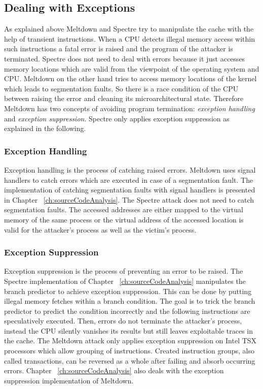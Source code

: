 \documentclass[a4paper,oneside,openright] {scrreprt}
\begin{document}
\subsection{Dealing with Exceptions}
\label{ch:intro:motivation:A}

As explained above Meltdown and Spectre try to manipulate the cache with the help of transient instructions. 
When a CPU detects illegal memory access within such instructions a fatal error is raised and the program of the attacker
is terminated. Spectre does not need to deal with errors because it just accesses memory locations which are valid from
the viewpoint of the operating system and CPU.
Meltdown on the other hand tries to access memory locations of the kernel which leads to segmentation faults.
So there is a race condition of the CPU between raising the error and cleaning its microarchitectural state.
Therefore Meltdown has two concepts of avoiding program termination: \textit{exception handling} and \textit{exception suppression}.
Spectre only applies exception suppression as explained in the following.

\subsubsection{Exception Handling}

Exception handling is the process of catching raised errors. Meltdown uses signal handlers to catch errors
which are executed in case of a segmentation fault. The implementation of catching 
segmentation faults with signal handlers is presented in Chapter ~\ref{ch:sourceCodeAnalysis}.
The Spectre attack does not need to catch segmentation faults. The accessed addresses are either
mapped to the virtual memory of the same process or the virtual address of the accessed location is valid 
for the attacker's process as well as the victim's process.

\subsubsection{Exception Suppression}

Exception suppression is the process of preventing an error to be raised. 
The Spectre implementation of Chapter ~\ref{ch:sourceCodeAnalysis} manipulates the branch predictor to achieve exception suppression.
This can be done by putting illegal memory fetches within a branch condition. 
The goal is to trick the branch predictor to predict the condition incorrectly and the following
instructions are speculatively executed.
Then, errors do not terminate the attacker's process, instead the CPU silently vanishes its results
 but still leaves exploitable traces in the cache.
The Meltdown attack only applies exception suppression on Intel TSX processors which allow grouping of instructions.
Created instruction groups, also called transactions, can be reversed as a whole after failing and absorb occurring errors.
Chapter ~\ref{ch:sourceCodeAnalysis} also deals with the exception suppression implementation of Meltdown.
\end{document}
